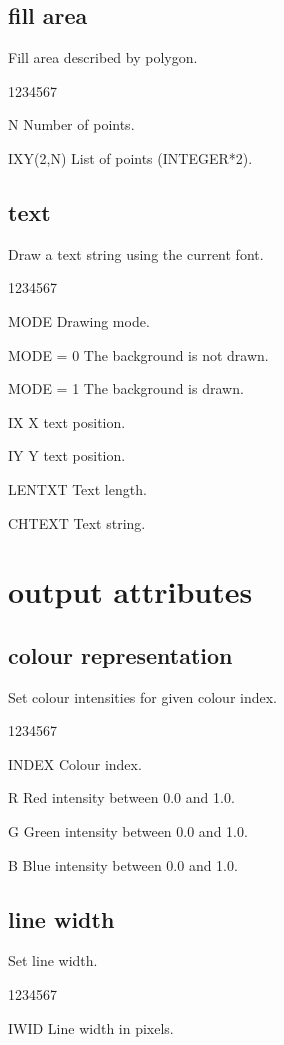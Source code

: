 \subsection{ fill area}
%
\Action
Fill area described by polygon.
\Pdesc
\begin{DLtt}{1234567}
\item[N] Number of points.
\item[IXY(2,N)] List of points (INTEGER*2).
\end{DLtt}
\subsection{ text}
%
\Action
Draw a text string using the current font.
\Pdesc
\begin{DLtt}{1234567}
\item[MODE] Drawing mode.
\item[MODE = 0] The background is not drawn.
\item[MODE = 1] The background is drawn.
\item[IX] X text position.
\item[IY] Y text position.
\item[LENTXT] Text length.
\item[CHTEXT] Text string.
\end{DLtt}
\newpage
%
%
\section{ output attributes}
\subsection{ colour representation}
%
\Action
Set colour intensities for given colour index.
\Pdesc
\begin{DLtt}{1234567}
\item[INDEX] Colour index.
\item[R] Red intensity between 0.0 and 1.0.
\item[G] Green intensity between 0.0 and 1.0.
\item[B] Blue intensity between 0.0 and 1.0.
\end{DLtt}
\subsection{ line width}
%
\Action
Set line width.
\Pdesc
\begin{DLtt}{1234567}
\item[IWID] Line width in pixels.
\end{DLtt}

